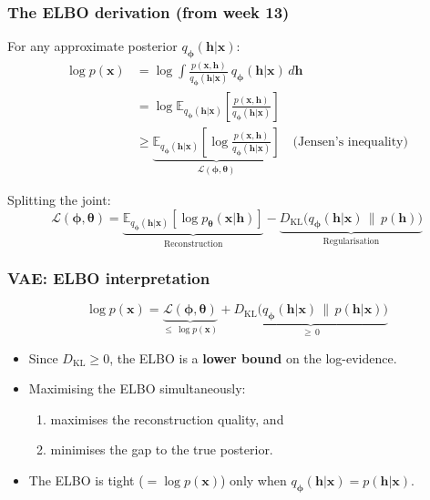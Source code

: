 \documentclass{beamer}
\newcommand{\E}{\mathbb{E}}
\newcommand{\DKL}{D_{\mathrm{KL}}}
\newcommand{\ELBO}{\mathcal{L}}
\begin{document}
\begin{frame}
\frametitle{The ELBO derivation (from week 13)}

For any approximate posterior $q_{\bm{\phi}}(\bm{h}|\bm{x})$:
\begin{align*}
\log p(\bm{x})
&= \log \int \frac{p(\bm{x},\bm{h})}{q_{\bm{\phi}}(\bm{h}|\bm{x})}\,
             q_{\bm{\phi}}(\bm{h}|\bm{x})\,d\bm{h} \\[4pt]
&= \log \E_{q_{\bm{\phi}}(\bm{h}|\bm{x})}
   \!\left[\frac{p(\bm{x},\bm{h})}{q_{\bm{\phi}}(\bm{h}|\bm{x})}\right] \\[4pt]
&\geq \underbrace{\E_{q_{\bm{\phi}}(\bm{h}|\bm{x})}
   \!\left[\log\frac{p(\bm{x},\bm{h})}{q_{\bm{\phi}}(\bm{h}|\bm{x})}\right]}_{
   \ELBO(\bm{\phi},\bm{\theta})}
\quad\text{(Jensen's inequality)}
\end{align*}

Splitting the joint:
\[
\boxed{\ELBO(\bm{\phi},\bm{\theta})
= \underbrace{\E_{q_{\bm{\phi}}(\bm{h}|\bm{x})}\!\left[
  \log p_{\bm{\theta}}(\bm{x}|\bm{h})\right]}_{\text{Reconstruction}}
  -\underbrace{\DKL\!\bigl(q_{\bm{\phi}}(\bm{h}|\bm{x})\,\|\,p(\bm{h})\bigr)}_{\text{Regularisation}}}
\]
\end{frame}

\begin{frame}
\frametitle{VAE: ELBO interpretation}

\[
\log p(\bm{x}) = \underbrace{\ELBO(\bm{\phi},\bm{\theta})}_{\leq\,\log p(\bm{x})}
+ \underbrace{\DKL\!\bigl(q_{\bm{\phi}}(\bm{h}|\bm{x})\,\|\,
                          p(\bm{h}|\bm{x})\bigr)}_{\geq\,0}
\]

\begin{itemize}
  \item Since $\DKL\geq 0$, the ELBO is a \textbf{lower bound} on the log-evidence.
  \item Maximising the ELBO simultaneously:
        \begin{enumerate}
          \item maximises the reconstruction quality, and
          \item minimises the gap to the true posterior.
        \end{enumerate}
  \item The ELBO is tight ($= \log p(\bm{x})$) only when
        $q_{\bm{\phi}}(\bm{h}|\bm{x}) = p(\bm{h}|\bm{x})$.
\end{itemize}
\end{frame}
\end{document}
